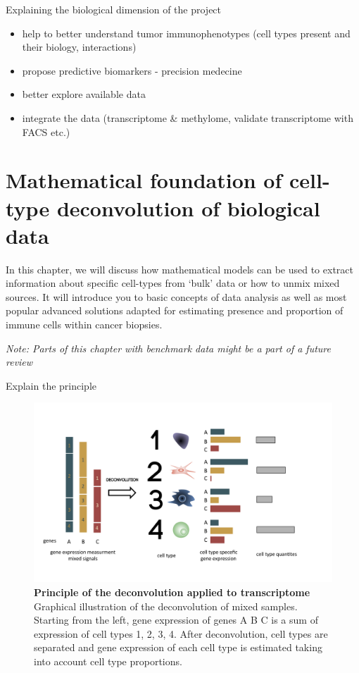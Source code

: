 \documentclass[12pt,]{book}
\providecommand{\tightlist}{%
  \setlength{\itemsep}{0pt}\setlength{\parskip}{0pt}}
\theoremstyle{definition}
\theoremstyle{definition}
\theoremstyle{definition}
\theoremstyle{remark}
\begin{document}
Explaining the biological dimension of the project

\begin{itemize}
\tightlist
\item
  help to better understand tumor immunophenotypes (cell types present
  and their biology, interactions)
\item
  propose predictive biomarkers - precision medecine
\item
  better explore available data
\item
  integrate the data (transcriptome \& methylome, validate transcriptome
  with FACS etc.)
\end{itemize}

\hypertarget{methods}{%
\chapter{Mathematical foundation of cell-type deconvolution of
biological data}\label{methods}}

In this chapter, we will discuss how mathematical models can be used to
extract information about specific cell-types from `bulk' data or how to
unmix mixed sources. It will introduce you to basic concepts of data
analysis as well as most popular advanced solutions adapted for
estimating presence and proportion of immune cells within cancer
biopsies.

\emph{Note: Parts of this chapter with benchmark data might be a part of
a future review}

Explain the principle

\begin{figure}

{\centering \includegraphics[width=1\linewidth]{figures-ext/deconv} 

}

\caption{\textbf{Principle of the
deconvolution applied to transcriptome} Graphical illustration of the
deconvolution of mixed samples. Starting from the left, gene expression
of genes A B C is a sum of expression of cell types 1, 2, 3, 4. After
deconvolution, cell types are separated and gene expression of each cell
type is estimated taking into account cell type proportions.}\label{fig:deconvolution-cartoon}
\end{figure}
\end{document}
